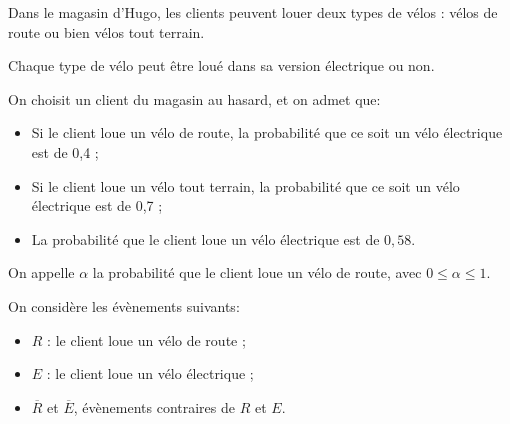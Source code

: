 \medskip

Dans le magasin d'Hugo, les clients peuvent louer deux types de vélos : vélos de route ou bien vélos tout terrain. 

Chaque type de vélo peut être loué dans sa version électrique ou non.

On choisit un client du magasin au hasard, et on admet que:
\begin{itemize}
\item Si le client loue un vélo de route, la probabilité que ce soit un vélo électrique est de 0,4 ;
\item Si le client loue un vélo tout terrain, la probabilité que ce soit un vélo électrique est de 0,7 ; 
\item La probabilité que le client loue un vélo électrique est de $0,58$.
\end{itemize}

\medskip

On appelle $\alpha$ la probabilité que le client loue un vélo de route, avec $0 \leqslant \alpha \leqslant 1$. 

On considère les évènements suivants:

\begin{itemize}
\item[$\bullet~~$] $R$ : \og le client loue un vélo de route \fg{} ;
\item[$\bullet~~$] $E$ : \og le client loue un vélo électrique \fg{} ;
\item[$\bullet~~$] $\overline{R}$ et $\overline{E}$, évènements contraires de $R$ et $E$.
\end{itemize}


























